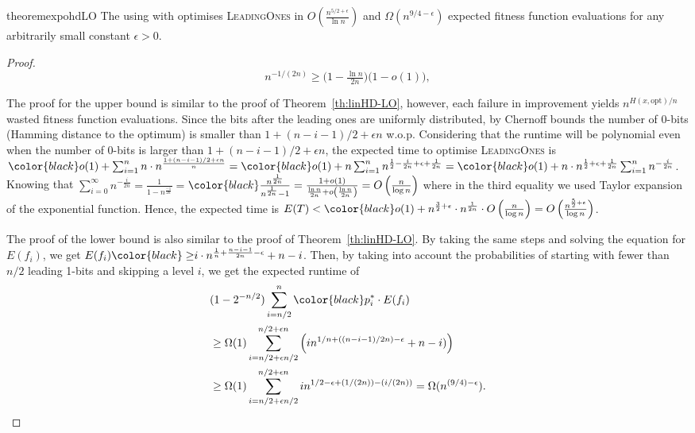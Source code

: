 
\begin{restatable}{theorem}{expohdLO}\label{thm:expohdLO}
	The {\oneoneIA } using \IPHfcm{} with {\expoHD } optimises \textsc{LeadingOnes} in 
	$O(\frac{n^{5/2+\epsilon}}{\ln n})$ and $\Omega(n^{9/4-\epsilon})$ expected 
	fitness function evaluations for any arbitrarily small constant $\epsilon>0$. 
\end{restatable}

\begin{proof}
	
	$$ n^{-1/(2n)} \ge \bigl(1-\tfrac{\ln n}{2n}\bigr)\bigl(1-o(1)\bigr), $$ 
	
	The proof for the upper bound is similar to the proof of Theorem~\ref{th:linHD-LO}, however, each 
	failure in improvement yields $n^{H(x, \text{opt})/n}$ wasted fitness function evaluations. 
	Since the bits after the leading ones are uniformly distributed, by Chernoff bounds the number 
	of 0-bits (Hamming distance to the optimum) is smaller than  $1+(n-i-1)/2+\epsilon n$ 
	w.o.p. {\color{black}Considering that the runtime will be polynomial even when the number of $0$-bits is larger than $1+(n-i-1)/2+\epsilon n$}, the expected time to optimise \textsc{LeadingOnes} is ${\color{black}o(1)}+\sum_{i=1}^{n} n \cdot 
	n^{\frac{1+(n-i-1)/2+\epsilon n}{n}}= {\color{black}o(1)}+n \sum_{i=1}^{n} 
	n^{\frac{1}{2}-\frac{i}{2n}+\epsilon+\frac{1}{2n}}={\color{black}o(1)}+n \cdot n^{\frac{1}{2}+\epsilon+\frac{1}{2n}} \sum_{i=1}^{n} 
	n^{-\frac{i}{2n}}$. Knowing that 
	$\sum_{i=0}^{\infty}n^{-\frac{i}{2n}}=\frac{1}{1-n^{\frac{-1}{2n}}}=${$\color{black} \frac{n^{\frac{1}{2n}}}{n^{\frac{1}{2n}} - 1} = \frac{1 + o(1)}{\frac{\ln{n}}{2n} + o\left(\frac{\ln{n}}{2n}\right)} = O\left(\frac{n}{\log{n}}\right)$ where in the third equality we used Taylor expansion of the exponential function.}  Hence, the expected time is $E(T) 
	< {\color{black}o(1)}+n^{\frac{3}{2}+\epsilon} \cdot n^{\frac{1}{2n}} \cdot O\left(\frac{n}{\log n}\right)=O\left(\frac{n^{\frac{5}{2}+\epsilon}}{\log n}\right)$.
	
	
	
	The proof of the lower bound is also similar to the proof of Theorem~\ref{th:linHD-LO}. 
	By taking the same steps and solving the equation for $E(f_i)$, we get
	$E(f_i){\color{black}\ge} i \cdot n^{\frac{1}{n}+\frac{n-i-1}{2n}-\epsilon}+n-i$. Then, by taking into account the probabilities of starting with fewer than $n/2$ leading 1-bits and skipping a level $i$, we get the expected runtime of 
	\begin{align*}
		&(1-2^{-n/2})\sum_{i=n/2}^{n} {\color{black}p_{i}^{*}} \cdot E(f_i)\\
		&\geq \Omega(1) \sum_{i=n/2+\epsilon 
			n/2}^{n/2+\epsilon n} 
		\left( i n^{1/n+((n-i-1)/2n)-\epsilon}+n-i )\right)\\
		&\geq \Omega(1) \sum_{i=n/2+\epsilon 
			n/2}^{n/2+\epsilon n}  in^{1/2-\epsilon+(1/(2n))-(i/(2n))}= \Omega(n^{(9/4)-\epsilon}).
	\end{align*} 
\end{proof}

